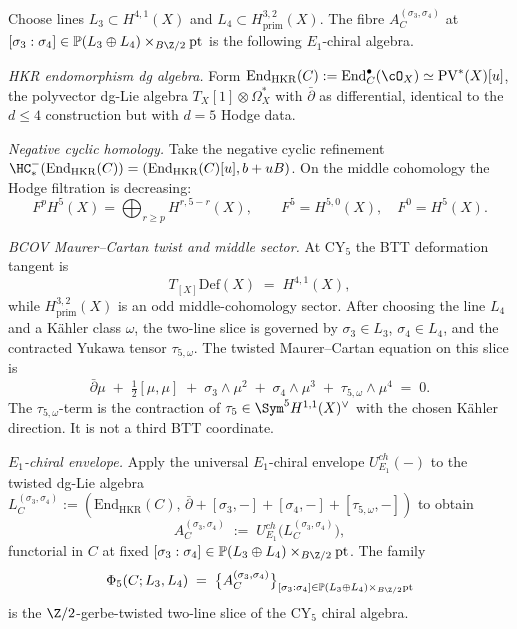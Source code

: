 \begin{construction}
\label{constr:phi-5-family}
Choose lines \(L_3\subset H^{4,1}(X)\) and
\(L_4\subset H^{3,2}_{\mathrm{prim}}(X)\). The fibre
\(A^{(\sigma_3,\sigma_4)}_C\) at
\([\sigma_3:\sigma_4]\in\mathbb P(L_3\oplus L_4)\times_{B\Z/2}\mathrm{pt}\)
is the following \(E_1\)-chiral algebra.

\noindent\emph{HKR endomorphism dg algebra.} Form
$\mathrm{End}_{\mathrm{HKR}}(C) := \mathrm{End}^\bullet_C(\cO_X) \simeq
\mathrm{PV}^*(X)[u]$, the polyvector dg-Lie algebra $T_X[1] \otimes \Omega^*_X$
with $\bar\partial$ as differential, identical to the $d \le 4$ construction but with
$d = 5$ Hodge data.

\noindent\emph{Negative cyclic homology.} Take the
negative cyclic refinement $\HC^-_*(\mathrm{End}_{\mathrm{HKR}}(C)) =
(\mathrm{End}_{\mathrm{HKR}}(C)[u], b + uB)$. On the middle cohomology the
Hodge filtration is decreasing:
\[
F^pH^5(X)=\bigoplus_{r\ge p}H^{r,5-r}(X),\qquad
F^5=H^{5,0}(X),\quad F^0=H^5(X).
\]

\noindent\emph{BCOV Maurer--Cartan twist and middle sector.}
At CY${}_5$ the BTT deformation tangent is
\[
 T_{[X]}\mathrm{Def}(X) \;=\; H^{4,1}(X),
\]
while \(H^{3,2}_{\mathrm{prim}}(X)\) is an odd middle-cohomology sector.
After choosing the line \(L_4\) and a K\"ahler class \(\omega\), the two-line
slice is governed by \(\sigma_3\in L_3\), \(\sigma_4\in L_4\), and the
contracted Yukawa tensor \(\tau_{5,\omega}\). The twisted Maurer--Cartan
equation on this slice is
\begin{equation}
\label{eq:bcov-mc-twist-d5}
\bar\partial \mu \;+\; \tfrac{1}{2}[\mu, \mu] \;+\; \sigma_3 \wedge \mu^2
 \;+\; \sigma_4 \wedge \mu^3 \;+\; \tau_{5,\omega} \wedge \mu^4 \;=\; 0.
\end{equation}
The \(\tau_{5,\omega}\)-term is the contraction of
\(\tau_5\in\Sym^5H^{1,1}(X)^\vee\) with the chosen K\"ahler direction. It is
not a third BTT coordinate.

\noindent\emph{$E_1$-chiral envelope.} Apply the
universal $E_1$-chiral envelope $U^{ch}_{E_1}(-)$ to the twisted dg-Lie algebra
$L^{(\sigma_3, \sigma_4)}_C := (\mathrm{End}_{\mathrm{HKR}}(C),\, \bar\partial +
[\sigma_3, -] + [\sigma_4, -] + [\tau_{5,\omega}, -])$ to obtain
\[
 A^{(\sigma_3, \sigma_4)}_C \;:=\; U^{ch}_{E_1}\bigl(L^{(\sigma_3, \sigma_4)}_C\bigr),
\]
functorial in \(C\) at fixed
\([\sigma_3:\sigma_4]\in\mathbb P(L_3\oplus L_4)\times_{B\Z/2}\mathrm{pt}\).
The family
\[
 \Phi_5(C;L_3,L_4) \;=\; \bigl\{ A^{(\sigma_3, \sigma_4)}_C \bigr\}_{[\sigma_3 : \sigma_4]
 \in \mathbb{P}(L_3\oplus L_4) \times_{B\Z/2}\mathrm{pt}}
\]
is the $\Z/2$-gerbe-twisted two-line slice of the CY${}_5$ chiral algebra.
\end{construction}

